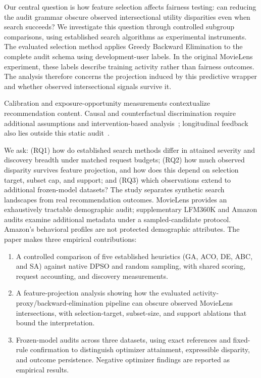 \documentclass[sigconf,nonacm]{acmart}
\begin{document}
Our central question is how feature selection affects fairness testing: can reducing the audit grammar obscure observed intersectional utility disparities even when search succeeds? We investigate this question through controlled subgroup comparisons, using established search algorithms as experimental instruments. The evaluated selection method applies Greedy Backward Elimination to the complete audit schema using development-user labels. In the original MovieLens experiment, these labels describe training activity rather than fairness outcomes. The analysis therefore concerns the projection induced by this predictive wrapper and whether observed intersectional signals survive it.

Calibration and exposure-opportunity measurements contextualize recommendation content. Causal and counterfactual discrimination require additional assumptions and intervention-based analysis~\cite{li2021towards,medda2024gnnuers}; longitudinal feedback also lies outside this static audit~\cite{mansoury2020feedback,zoralioglu2024dynamic}.

We ask: (RQ1) how do established search methods differ in attained severity and discovery breadth under matched request budgets; (RQ2) how much observed disparity survives feature projection, and how does this depend on selection target, subset cap, and support; and (RQ3) which observations extend to additional frozen-model datasets? The study separates synthetic search landscapes from real recommendation outcomes. MovieLens provides an exhaustively tractable demographic audit; supplementary LFM360K and Amazon audits examine additional metadata under a sampled-candidate protocol. Amazon's behavioral profiles are not protected demographic attributes. The paper makes three empirical contributions:
\begin{enumerate}
    \item A controlled comparison of five established heuristics (GA, ACO, DE, ABC, and SA) against native DPSO and random sampling, with shared scoring, request accounting, and discovery measurements.
    \item A feature-projection analysis showing how the evaluated activity-proxy/backward-elimination pipeline can obscure observed MovieLens intersections, with selection-target, subset-size, and support ablations that bound the interpretation.
    \item Frozen-model audits across three datasets, using exact references and fixed-rule confirmation to distinguish optimizer attainment, expressible disparity, and outcome persistence. Negative optimizer findings are reported as empirical results.
\end{enumerate}
\end{document}
